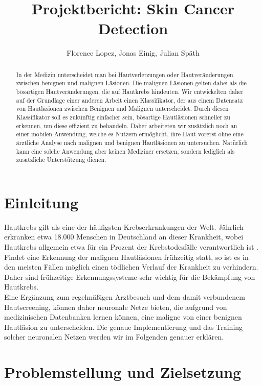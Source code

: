 \documentclass[a4paper, doc]{apa6}
\title{Projektbericht: Skin Cancer Detection}
\author{Florence Lopez, Jonas Einig, Julian Späth }
\affiliation{Department of Computer Science, University of Tübingen}
\begin{document}
\maketitle
\begin{abstract}
	In der Medizin unterscheidet man bei Hautverletzungen oder Hautveränderungen zwischen benignen und malignen Läsionen. Die malignen Läsionen gelten dabei als die bösartigen Hautveränderungen, die auf Hautkrebs hindeuten. Wir entwickelten daher auf der Grundlage einer anderen Arbeit einen Klassifikator, der aus einem Datensatz von Hautläsionen zwischen Benignen und Malignen unterscheidet. Durch diesen Klassifikator soll es zukünftig einfacher sein, bösartige Hautläsionen schneller zu erkennen, um diese effizient zu behandeln. Daher arbeiteten wir zusätzlich noch an einer mobilen Anwendung, welche es Nutzern ermöglicht, ihre Haut vorerst ohne eine ärztliche Analyse nach malignen und benignen Hautläsionen zu untersuchen. Natürlich kann eine solche Anwendung aber keinen Mediziner ersetzen, sondern lediglich als zusätzliche Unterstützung dienen. 
\end{abstract}
    
    
\section{Einleitung}

Hautkrebs gilt als eine der häufigsten Krebserkrankungen der Welt. Jährlich erkranken etwa 18.000 Menschen in Deutschland an dieser Krankheit, wobei Hautkrebs allgemein etwa für ein Prozent der Krebstodesfälle verantwortlich ist \citep{hautkrebs}. Findet eine Erkennung der malignen Hautläsionen frühzeitig statt, so ist es in den meisten Fällen möglich einen tödlichen Verlauf der Krankheit zu verhindern. Daher sind frühzeitige Erkennungssysteme sehr wichtig für die Bekämpfung von Hautkrebs.\\
\noindent Eine Ergänzung zum regelmäßigen Arztbesuch und dem damit verbundenem Hautscreening, können daher neuronale Netze bieten, die aufgrund von medizinischen Datenbanken lernen können, eine maligne von einer benignen Hautläsion zu unterscheiden. Die genaue Implementierung und das Training solcher neuronalen Netzen werden wir im Folgenden genauer erklären. 

\section{Problemstellung und Zielsetzung}
\end{document}
